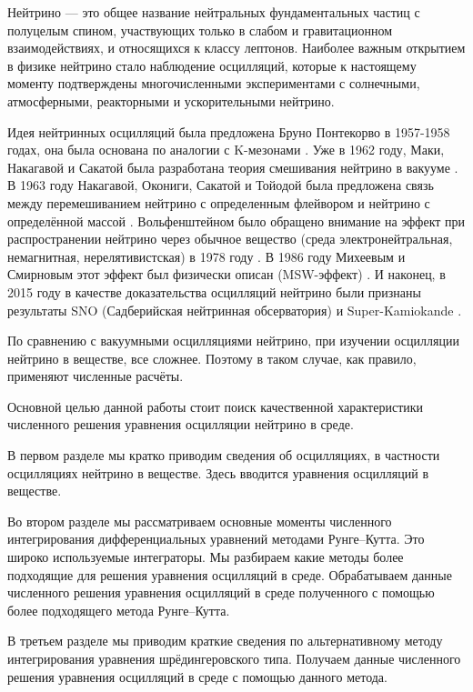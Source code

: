 \documentclass[a4paper,12pt]{article}
\begin{document}
Нейтрино --- это общее название нейтральных фундаментальных частиц с полуцелым спином, участвующих только в слабом и гравитационном взаимодействиях, и относящихся к классу лептонов. Наиболее важным открытием в физике нейтрино стало наблюдение осцилляций, которые к настоящему моменту подтверждены многочисленными экспериментами с солнечными, атмосферными, реакторными и ускорительными нейтрино.

Идея нейтринных осцилляций была предложена Бруно Понтекорво в 1957-1958 годах, она была основана по аналогии с K-мезонами \cite{11, 22}. Уже в 1962 году, Маки, Накагавой и Сакатой была разработана теория смешивания нейтрино в вакууме \cite{33}. В 1963 году Накагавой, Окониги, Сакатой и Тойодой была предложена связь между перемешиванием нейтрино с определенным флейвором и нейтрино с определённой массой \cite{44}. Вольфенштейном было обращено внимание на эффект при распространении нейтрино через обычное вещество (среда электронейтральная, немагнитная, нерелятивистская) в 1978 году \cite{55, 66}. В 1986 году Михеевым и Смирновым этот эффект был физически описан (MSW-эффект) \cite{77, 88}. И наконец, в 2015 году в качестве доказательства осцилляций нейтрино были признаны результаты SNO (Садберийская нейтринная обсерватория) \cite{99} и Super-Kamiokande \cite{1010}.

По сравнению с вакуумными осцилляциями нейтрино, при изучении осцилляции нейтрино в веществе, все сложнее. Поэтому в таком случае, как правило, применяют численные расчёты.

Основной целью данной работы стоит поиск качественной характеристики численного решения уравнения осцилляции нейтрино в среде.

В первом разделе мы кратко приводим сведения об осцилляциях, в частности осцилляциях нейтрино в веществе. Здесь вводится уравнения осцилляций в веществе.

Во втором разделе мы рассматриваем основные моменты численного интегрирования дифференциальных уравнений методами Рунге--Кутта. Это широко используемые интеграторы. Мы разбираем какие методы более подходящие для решения уравнения осцилляций в среде. Обрабатываем данные численного решения уравнения осцилляций в среде полученного с помощью более подходящего метода Рунге--Кутта.

В третьем разделе мы приводим краткие сведения по альтернативному методу интегрирования уравнения шрёдингеровского типа. Получаем данные численного решения уравнения осцилляций в среде с помощью данного метода.
\end{document}

